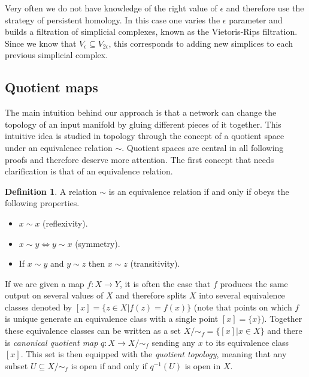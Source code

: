 \documentclass[10pt]{article} %
\theoremstyle{plain}
\theoremstyle{definition}
\newtheorem{definition}[theorem]{Definition}
\theoremstyle{remark}
\begin{document}
Very often we do not have knowledge of the right value of $\epsilon$ and therefore use the strategy of persistent homology. In this case one {varies the $\epsilon$ parameter} and builds a filtration of simplicial complexes, known as the Vietoris-Rips filtration. Since we know that $V_\epsilon \subseteq V_{2\epsilon}$, this corresponds to adding new simplices to each previous simplicial complex.

\subsection{Quotient maps}

The main intuition behind our approach is that a network can change the topology of an input manifold by gluing different pieces of it together. This intuitive idea is studied in topology through the concept of a quotient space under an equivalence relation $\sim$. Quotient spaces are central in all following proofs and therefore deserve more attention. The first concept that needs clarification is that of an equivalence relation.

\begin{definition}
    A relation $\sim$ is an equivalence relation if and only if obeys the following properties.
    \begin{itemize}
        \item $x \sim x$ (reflexivity).
        \item $x \sim y \Leftrightarrow y\sim x$ (symmetry).
        \item If $x \sim y$ and $y \sim z$ then $x \sim z$ (transitivity).
    \end{itemize}
\end{definition}

If we are given a map $f:X \to Y$, it is often the case that $f$ produces the same output on several values of $X$ and therefore splits $X$ into several equivalence classes denoted by $[x] = \{z \in X | f(z)=f(x)\}$ (note that points on which $f$ is unique generate an equivalence class with a single point $[x] = \{x\}$). Together these equivalence classes can be written as a set $X/\sim_f = \{[x]| x\in X\}$ and there is \textit{canonical quotient map} $q:X \to X/\sim_f$ sending any $x$ to its equivalence class $[x]$. This set is then equipped with the \textit{quotient topology}, meaning that any subset $U \subseteq X/\sim_f$ is open if and only if $q^{-1}(U)$ is open in $X$.
\end{document}
